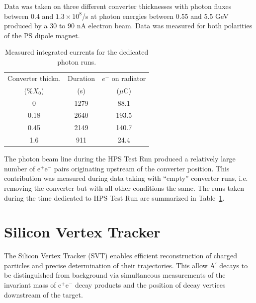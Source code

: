 \documentclass[final,3p,times,twocolumn]{elsarticle}
\newcommand{\Aprime}{A\ensuremath{^\prime}}
\newcommand{\ee}{e$^+$e$^-$}
\begin{document}
 
 Data was taken on three different converter thicknesses with photon fluxes between 0.4 and 
 $1.3\times10^8$/s at photon energies between 0.55 and 5.5 GeV produced by a 30 to 90 nA electron 
 beam. Data was measured for both polarities of the PS dipole magnet.
\begin{table}[]
\begin{center}
{\small
\begin{tabular}{|c|c|c|}
\hline
Converter thickn. & Duration &  $e^-$ on radiator \\
 (\%$X_0$) & (s) & ($\mu$C)    \\   
\hline
0    & 1279  &   88.1 \\ %
0.18   & 2640 &   193.5 \\ %
0.45  & 2149 &     140.7 \\ %
1.6   & 911 &   24.4 \\ %
\hline
\end{tabular}
}
\caption{Measured integrated currents for the dedicated photon runs.
\label{tab:currents}}
\end{center}
\end{table}
The photon beam line during the HPS Test Run produced a relatively large number of \ee{} pairs 
originating upstream of the converter position. This contribution was measured during data taking 
with ``empty'' converter runs, i.e. removing the converter but with all other conditions the same. 
The runs taken during the time dedicated to HPS Test Run are summarized in Table~\ref{tab:currents}.




\section{Silicon Vertex Tracker}
\label{svt}

The Silicon Vertex Tracker (SVT) enables efficient reconstruction of charged particles and precise 
determination of their trajectories. This allow \Aprime{} decays to be distinguished 
from background via simultaneous measurements of the invariant mass of \ee{} decay products and the 
position of decay vertices downstream of the target. 
\end{document}
